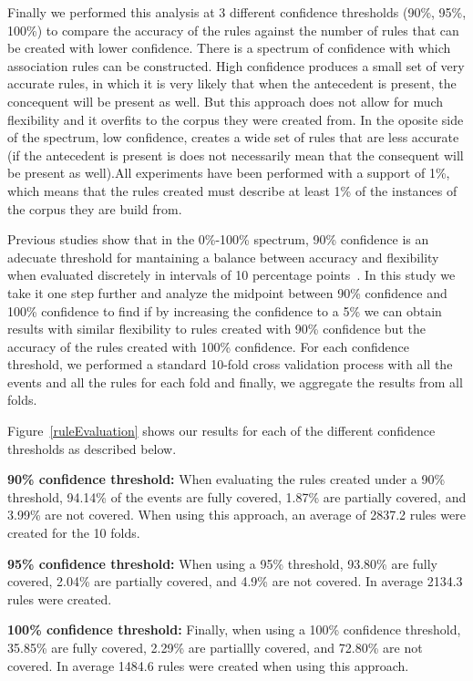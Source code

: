 \documentclass[sigconf]{acmart}
\begin{document}
Finally we performed this analysis at 3 different confidence thresholds
(90\%, 95\%, 100\%) to compare the accuracy of the rules against the 
number of rules that can be created with lower confidence. 
There is a spectrum of confidence with which association rules
can be constructed. High confidence produces a small set of very
accurate rules, in which it is very likely that when the antecedent
is present, the concequent will be present as well. But this approach
does not allow for much flexibility and it overfits to the corpus 
they were created from. In the oposite side of the spectrum, low 
confidence, creates a wide set of rules that are less accurate (if
the antecedent is present is does not necessarily mean that the 
consequent will be present as well).All 
experiments have been performed with a support of 1\%, which 
means that the rules created must describe
at least 1\% of the instances of the corpus they are build from.

Previous studies show that in the 0\%-100\% spectrum, 
90\% confidence is an adecuate threshold 
for mantaining a balance between accuracy and flexibility when evaluated
discretely in intervals of 10 percentage points~\cite{Soto18}.
In this study we take it one step further and analyze the midpoint between 90\%
confidence and 100\% confidence to find if by increasing the confidence to a 5\%
we can obtain results with similar flexibility to rules created with 90\% 
confidence but the accuracy of the rules created with 100\% confidence.
For each confidence
threshold, we performed a standard 10-fold cross validation process with all the
events and all the rules for each fold and finally, we aggregate the results
from all folds.

Figure~\ref{ruleEvaluation} shows our results for each of the 
different confidence thresholds as described below.

\noindent\textbf{90\% confidence threshold:}
When evaluating the rules created under a 90\% threshold, 94.14\% of the 
events are fully covered, 1.87\% are partially covered, and 3.99\% are
not covered. When using this approach, an average of 2837.2 rules were
created for the 10 folds.

\noindent\textbf{95\% confidence threshold:}
When using a 95\% threshold, 93.80\% are fully covered, 2.04\% are
partially covered, and 4.9\% are not covered. In average 2134.3 rules
were created.

\noindent\textbf{100\% confidence threshold:}
Finally, when using a 100\% confidence threshold, 35.85\% are fully
covered, 2.29\% are partiallly covered, and 72.80\% are not covered.
In average 1484.6 rules were created when using this approach.
\end{document}
